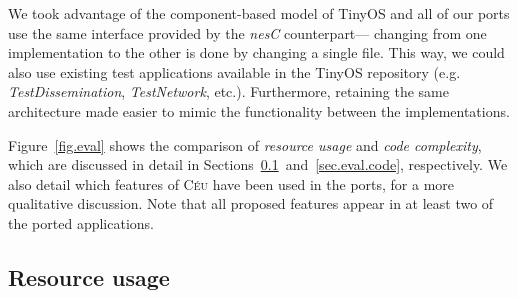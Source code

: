 \documentclass[10pt]{sensys-proc}
\newcommand{\CEU}{\textsc{C\'{e}u}\xspace}
\newcommand{\code}[1] {{\small{\texttt{#1}}}}
\begin{document}
We took advantage of the component-based model of TinyOS and all of our ports 
use the same interface provided by the \emph{nesC} counterpart---
changing from one implementation to the other is done by changing a single 
file.
This way, we could also use existing test applications available in the TinyOS 
repository (e.g. \emph{TestDissemination}, \emph{TestNetwork}, etc.).
Furthermore, retaining the same architecture made easier to mimic the 
functionality between the implementations.

Figure~\ref{fig.eval} shows the comparison of \emph{resource usage} and 
\emph{code complexity}, which are discussed in detail in
Sections~\ref{sec.eval.resource}~and~\ref{sec.eval.code}, respectively.
We also detail which features of \CEU have been used in the ports, for a more 
qualitative discussion.
Note that all proposed features appear in at least two of the ported 
applications.

\begin{comment}
TODO

However, without architectural changes, we could not express XXX how.
more lines, more ROM
    - not always represent the Céu way
        - full DRIP 40%

and is used  works (e.g. \cite{wsn.protothreads,wsn.sol,wsn.flask}) already 
        include comparisons to nesc, allowing (at least) an indirect comparison 
of \CEU{} with them.

\footnote {
    We used $TinyOS-2.1.1$ and $micaz$ motes, and the sample applications found 
in \code{/opt/tinyos-2.1.1/apps/}.
}
\end{comment}

\subsection{Resource usage}
\label{sec.eval.resource}




\end{document}
